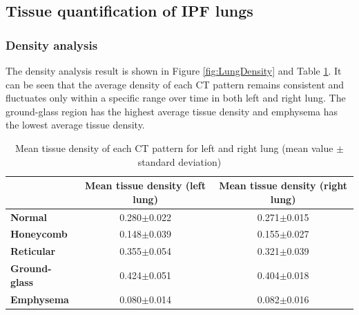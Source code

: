 \subsection{Tissue quantification of IPF lungs}
\subsubsection{Density analysis}
The density analysis result is shown in Figure \ref{fig:LungDensity} and Table \ref{tab:MeanDensity}. It can be seen that the average density of each CT pattern remains consistent and fluctuates only within a specific range over time in both left and right lung. The ground-glass region has the highest average tissue density and emphysema has the lowest average tissue density. 

\begin{table}[htbp]
\centering
\caption{Mean tissue density of each CT pattern for left and right lung (mean value $\pm$ standard deviation)}
\label{tab:MeanDensity}
\begin{tabular}{|l | c | c|}
\hline
& \bf{Mean tissue density (left lung)} & \bf{Mean tissue density (right lung)} \\ 
\hline
\bf{Normal} & 0.280$\pm$0.022 & 0.271$\pm$0.015 \\
\hline
\bf{Honeycomb} & 0.148$\pm$0.039 & 0.155$\pm$0.027 \\
\hline
\bf{Reticular} & 0.355$\pm$0.054 & 0.321$\pm$0.039 \\
\hline
\bf{Ground-glass} & 0.424$\pm$0.051 & 0.404$\pm$0.018 \\
\hline
\bf{Emphysema} & 0.080$\pm$0.014 & 0.082$\pm$0.016 \\
\hline
\end{tabular}
\end{table}

\newpage


